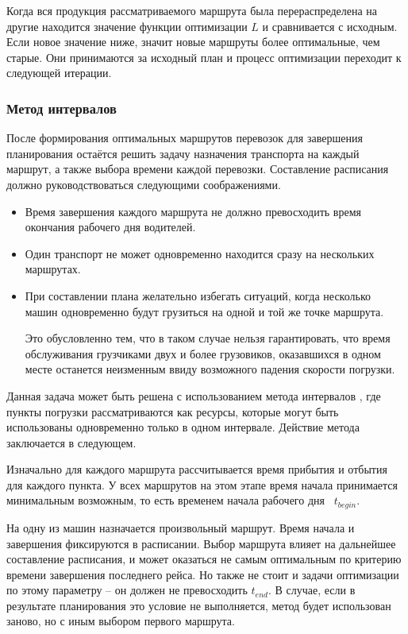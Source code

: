 	Когда вся продукция рассматриваемого маршрута была перераспределена на другие находится значение функции оптимизации $L$ и сравнивается с исходным. Если новое значение ниже, значит новые маршруты более оптимальные, чем старые. Они принимаются за исходный план и процесс оптимизации переходит к следующей итерации.
	
	\subsubsection{Метод интервалов}
	После формирования оптимальных маршрутов перевозок для завершения планирования остаётся решить задачу назначения транспорта на каждый маршрут, а также выбора времени каждой перевозки. Составление расписания должно руководствоваться следующими соображениями.
	
	\begin{itemize}
		\item Время завершения каждого маршрута не должно превосходить время \, окончания рабочего дня водителей.
		\item Один транспорт не может одновременно находится сразу на нескольких маршрутах.
		\item При составлении плана желательно избегать ситуаций, когда несколько машин одновременно будут грузиться на одной и той же точке маршрута. 
		
		Это обусловленно тем, что в таком случае нельзя гарантировать, что время обслуживания грузчиками двух и более грузовиков, оказавшихся в одном месте останется неизменным ввиду возможного падения скорости погрузки.
	\end{itemize}
	
	Данная задача может быть решена с использованием метода интервалов \cite{schedule:intervals}, где пункты погрузки рассматриваются как ресурсы, которые могут быть использованы одновременно только в одном интервале. Действие метода заключается в следующем.
	
	Изначально для каждого маршрута рассчитывается время прибытия и отбытия для каждого пункта. У всех маршрутов на этом этапе время начала принимается минимальным возможным, то есть временем начала рабочего дня \, $t_{begin}$.
	
	На одну из машин назначается произвольный маршрут. Время начала и завершения фиксируются в расписании. Выбор маршрута влияет на дальнейшее составление расписания, и может оказаться не самым оптимальным по критерию времени завершения последнего рейса. Но также не стоит и задачи оптимизации по этому параметру -- он должен не превосходить $t_{end}$. В случае, если в результате планирования это условие не выполняется, метод будет использован заново, но с иным выбором первого маршрута.
	
